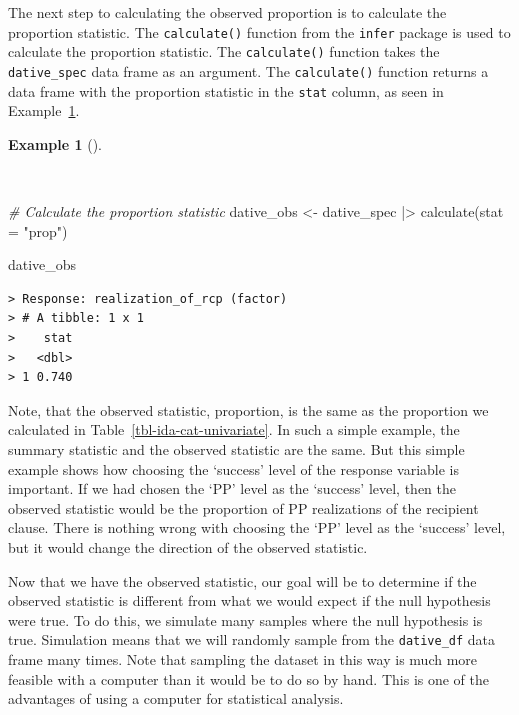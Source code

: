 \documentclass[
  letterpaper,
  DIV=11,
  numbers=noendperiod]{scrreprt}
\newenvironment{Shaded}{\begin{snugshade}}{\end{snugshade}}
\newcommand{\AttributeTok}[1]{\textcolor[rgb]{0.00,0.00,0.00}{#1}}
\newcommand{\CommentTok}[1]{\textcolor[rgb]{0.00,0.00,0.00}{\textit{#1}}}
\newcommand{\FunctionTok}[1]{\textcolor[rgb]{0.00,0.00,0.00}{#1}}
\newcommand{\NormalTok}[1]{\textcolor[rgb]{0.00,0.00,0.00}{#1}}
\newcommand{\OtherTok}[1]{\textcolor[rgb]{0.00,0.00,0.00}{#1}}
\newcommand{\SpecialCharTok}[1]{\textcolor[rgb]{0.00,0.00,0.00}{#1}}
\newcommand{\StringTok}[1]{\textcolor[rgb]{0.00,0.00,0.00}{#1}}
\theoremstyle{definition}
\newtheorem{example}{Example}[chapter]
\theoremstyle{remark}
\begin{document}
The next step to calculating the observed proportion is to calculate the
proportion statistic. The \texttt{calculate()} function from the
\texttt{infer} package is used to calculate the proportion statistic.
The \texttt{calculate()} function takes the \texttt{dative\_spec} data
frame as an argument. The \texttt{calculate()} function returns a data
frame with the proportion statistic in the \texttt{stat} column, as seen
in Example~\ref{exm-ida-cat-calculate}.

\begin{example}[]\protect\hypertarget{exm-ida-cat-calculate}{}\label{exm-ida-cat-calculate}

~

\begin{Shaded}
\begin{Highlighting}[]
\CommentTok{\# Calculate the proportion statistic}
\NormalTok{dative\_obs }\OtherTok{\textless{}{-}}
\NormalTok{  dative\_spec }\SpecialCharTok{|\textgreater{}}
  \FunctionTok{calculate}\NormalTok{(}\AttributeTok{stat =} \StringTok{"prop"}\NormalTok{)}

\NormalTok{dative\_obs}
\end{Highlighting}
\end{Shaded}

\begin{verbatim}
> Response: realization_of_rcp (factor)
> # A tibble: 1 x 1
>    stat
>   <dbl>
> 1 0.740
\end{verbatim}

\end{example}

Note, that the observed statistic, proportion, is the same as the
proportion we calculated in Table~\ref{tbl-ida-cat-univariate}. In such
a simple example, the summary statistic and the observed statistic are
the same. But this simple example shows how choosing the `success' level
of the response variable is important. If we had chosen the `PP' level
as the `success' level, then the observed statistic would be the
proportion of PP realizations of the recipient clause. There is nothing
wrong with choosing the `PP' level as the `success' level, but it would
change the direction of the observed statistic.

Now that we have the observed statistic, our goal will be to determine
if the observed statistic is different from what we would expect if the
null hypothesis were true. To do this, we simulate many samples where
the null hypothesis is true. Simulation means that we will randomly
sample from the \texttt{dative\_df} data frame many times. Note that
sampling the dataset in this way is much more feasible with a computer
than it would be to do so by hand. This is one of the advantages of
using a computer for statistical analysis.
\end{document}
